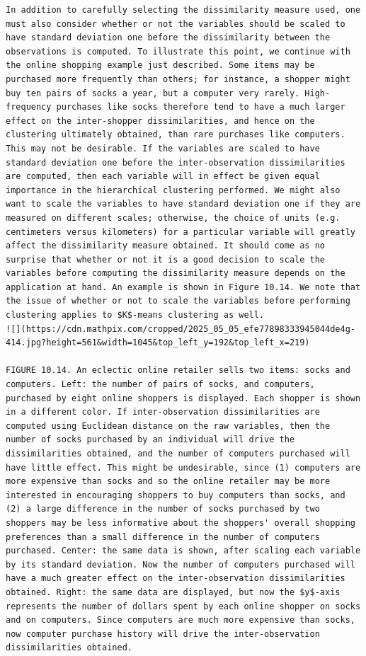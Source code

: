 \documentclass[10pt]{article}
\begin{document}
\begin{verbatim}
In addition to carefully selecting the dissimilarity measure used, one must also consider whether or not the variables should be scaled to have standard deviation one before the dissimilarity between the observations is computed. To illustrate this point, we continue with the online shopping example just described. Some items may be purchased more frequently than others; for instance, a shopper might buy ten pairs of socks a year, but a computer very rarely. High-frequency purchases like socks therefore tend to have a much larger effect on the inter-shopper dissimilarities, and hence on the clustering ultimately obtained, than rare purchases like computers. This may not be desirable. If the variables are scaled to have standard deviation one before the inter-observation dissimilarities are computed, then each variable will in effect be given equal importance in the hierarchical clustering performed. We might also want to scale the variables to have standard deviation one if they are measured on different scales; otherwise, the choice of units (e.g. centimeters versus kilometers) for a particular variable will greatly affect the dissimilarity measure obtained. It should come as no surprise that whether or not it is a good decision to scale the variables before computing the dissimilarity measure depends on the application at hand. An example is shown in Figure 10.14. We note that the issue of whether or not to scale the variables before performing clustering applies to $K$-means clustering as well.
![](https://cdn.mathpix.com/cropped/2025_05_05_efe77898333945044de4g-414.jpg?height=561&width=1045&top_left_y=192&top_left_x=219)

FIGURE 10.14. An eclectic online retailer sells two items: socks and computers. Left: the number of pairs of socks, and computers, purchased by eight online shoppers is displayed. Each shopper is shown in a different color. If inter-observation dissimilarities are computed using Euclidean distance on the raw variables, then the number of socks purchased by an individual will drive the dissimilarities obtained, and the number of computers purchased will have little effect. This might be undesirable, since (1) computers are more expensive than socks and so the online retailer may be more interested in encouraging shoppers to buy computers than socks, and (2) a large difference in the number of socks purchased by two shoppers may be less informative about the shoppers' overall shopping preferences than a small difference in the number of computers purchased. Center: the same data is shown, after scaling each variable by its standard deviation. Now the number of computers purchased will have a much greater effect on the inter-observation dissimilarities obtained. Right: the same data are displayed, but now the $y$-axis represents the number of dollars spent by each online shopper on socks and on computers. Since computers are much more expensive than socks, now computer purchase history will drive the inter-observation dissimilarities obtained.


\end{verbatim}
\end{document}
